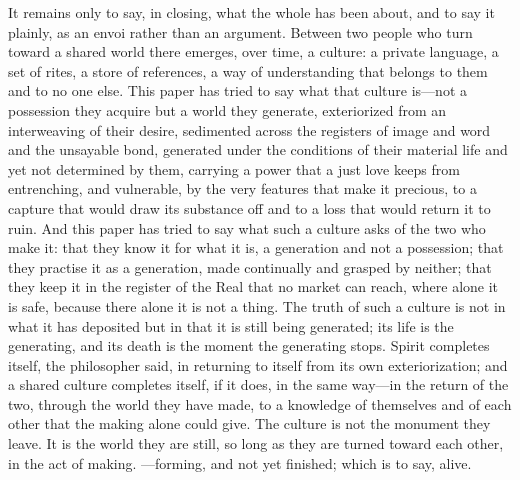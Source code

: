 It remains only to say, in closing, what the whole has been about, and to say it plainly, as an envoi rather than an argument. Between two people who turn toward a shared world there emerges, over time, a culture: a private language, a set of rites, a store of references, a way of understanding that belongs to them and to no one else. This paper has tried to say what that culture is---not a possession they acquire but a world they generate, exteriorized from an interweaving of their desire, sedimented across the registers of image and word and the unsayable bond, generated under the conditions of their material life and yet not determined by them, carrying a power that a just love keeps from entrenching, and vulnerable, by the very features that make it precious, to a capture that would draw its substance off and to a loss that would return it to ruin. And this paper has tried to say what such a culture asks of the two who make it: that they know it for what it is, a generation and not a possession; that they practise it as a generation, made continually and grasped by neither; that they keep it in the register of the Real that no market can reach, where alone it is safe, because there alone it is not a thing. The truth of such a culture is not in what it has deposited but in that it is still being generated; its life is the generating, and its death is the moment the generating stops. Spirit completes itself, the philosopher said, in returning to itself from its own exteriorization; and a shared culture completes itself, if it does, in the same way---in the return of the two, through the world they have made, to a knowledge of themselves and of each other that the making alone could give. The culture is not the monument they leave. It is the world they are still, so long as they are turned toward each other, in the act of making. ---forming, and not yet finished; which is to say, alive.
